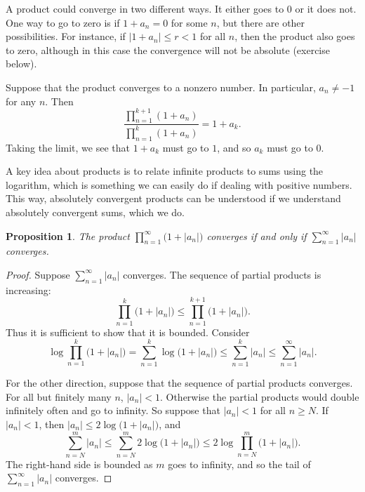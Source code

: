 \documentclass[12pt,openany]{book}
\newcommand{\sabs}[1]{\lvert {#1} \rvert}
\theoremstyle{plain}
\newtheorem{prop}[thm]{Proposition}
\theoremstyle{remark}
\theoremstyle{definition}
\theoremstyle{exercise}
\theoremstyle{example}
\begin{document}
A product could converge in two different ways.  It either goes to $0$ or it
does not.
One way to go to zero is if $1+a_n=0$ for some $n$, but there
are other possibilities.  For instance, if $\sabs{1+a_n} \leq r < 1$ for all
$n$, then the product also goes to zero, although in this case the
convergence will not be absolute (exercise below).

Suppose that the product converges to a nonzero number.
In particular, $a_n \not= -1$ for any $n$.  Then
\begin{equation*}
\frac{
\prod_{n=1}^{k+1} (1+a_n)
}{
\prod_{n=1}^{k} (1+a_n)
}
=1+a_k .
\end{equation*}
Taking the limit, we see that $1+a_k$ must go to $1$,
and so $a_k$ must go to $0$.

A key idea about products is to relate infinite products to sums using the
logarithm, which is something we can easily do if dealing with positive
numbers.  This way, absolutely convergent products can be understood
if we understand absolutely convergent sums, which we do.

\begin{prop} \label{prop:infprodabsconvinfsum}
The product $\prod_{n=1}^\infty \bigl(1+\sabs{a_n}\bigr)$ converges if and only if
$\sum_{n=1}^\infty \sabs{a_n}$ converges.
\end{prop}

\begin{proof}
Suppose $\sum_{n=1}^\infty \sabs{a_n}$ converges.
The sequence of partial products is increasing:
\begin{equation*}
\prod_{n=1}^k \bigl(1+\sabs{a_n}\bigr) \leq
\prod_{n=1}^{k+1} \bigl(1+\sabs{a_n}\bigr) .
\end{equation*}
Thus it is sufficient to show that it is bounded.
Consider
\begin{equation*}
\log \prod_{n=1}^k \bigl(1+\sabs{a_n}\bigr)
=
\sum_{n=1}^k \log \bigl(1+\sabs{a_n}\bigr)
\leq
\sum_{n=1}^k \sabs{a_n} \leq
\sum_{n=1}^\infty \sabs{a_n} .
\end{equation*}

For the other direction, suppose that the sequence of partial products
converges.  For all but finitely many $n$, $\sabs{a_n} < 1$.
Otherwise the partial products would double infinitely often and go to
infinity.  So suppose that $\sabs{a_n} < 1$ for all $n \geq N$.
If $\sabs{a_n} < 1$, then $\sabs{a_n} \leq 2 \log \bigl(1+\sabs{a_n}\bigr)$,
and
\begin{equation*}
\sum_{n=N}^m \sabs{a_n}
\leq
\sum_{n=N}^m 2 \log \bigl(1+\sabs{a_n}\bigr)
\leq
2 \log \prod_{n=N}^m \bigl(1+\sabs{a_n}\bigr) .
\end{equation*}
The right-hand side is bounded as $m$ goes to infinity, and so the tail of
$\sum_{n=1}^\infty \sabs{a_n}$ converges.
\end{proof}
\end{document}
